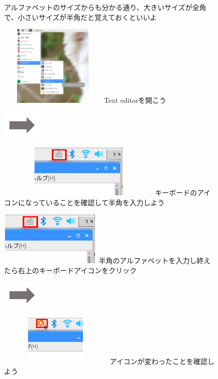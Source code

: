 \documentclass[a4paper,12pt]{jarticle}
\begin{document}
\begin{figure}[ht]
\begin{minipage}{16.578cm}
アルファベットのサイズからも分かる通り、大きいサイズが全角で、小さいサイズが半角だと覚えておくといいよ
\end{minipage}
\begin{minipage}{5.578cm}
\includegraphics[width=5.172cm,height=3.924cm]{textbook-img067.png}
 Text editorを開こう
\end{minipage}
\includegraphics[width=1.919cm,height=1.365cm]{textbook-img053.png}
\begin{minipage}{7.931cm}
\includegraphics[width=7.868cm,height=2.534cm]{textbook-img059.png}
キーボードのアイコンになっていることを確認して半角を入力しよう
\end{minipage}
\begin{minipage}{6.345cm}
\includegraphics[width=4.889cm,height=2.596cm]{textbook-img059.png}
半角のアルファベットを入力し終えたら右上のキーボードアイコンをクリック
\end{minipage}
\includegraphics[width=1.919cm,height=1.365cm]{textbook-img053.png}
\begin{minipage}{7.524cm}
\includegraphics[width=5.471cm,height=2.469cm]{textbook-img062.png}
アイコンが変わったことを確認しよう
\end{minipage}


\end{figure}
\end{document}
